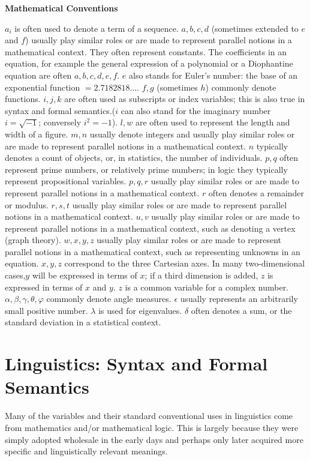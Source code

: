 \documentclass{article}
\begin{document}
 \begin{center}{\bf Mathematical Conventions}\end{center}
\ex $a_i$ is often used to denote a term of a sequence.
\ex $a, b, c, d$ (sometimes extended to $e$ and $f$) usually play similar roles or are made to represent parallel notions in a mathematical context. They often represent constants.
The coefficients in an equation, for example the general expression of a polynomial or a Diophantine equation are often $a, b, c, d, e, f$.
\ex $e$ also stands for Euler's number: the base of an exponential function  $= 2.7182818\ldots$.
\ex $f, g$ (sometimes $h$) commonly denote functions.
\ex $i, j, k$ are often used as subscripts or index variables; this is also true in syntax and formal semantics.($i$ can also stand for the imaginary number $i = \sqrt{-1}$; conversely $i^2 = -1$). 
\ex $l, w$ are often used to represent the length and width of a figure.
\ex $m, n$ usually denote integers and usually play similar roles or are made to represent parallel notions in a mathematical context.
\ex $n$ typically denotes a count of objects, or, in statistics, the number of individuals.
\ex $p, q$ often represent prime numbers, or relatively prime numbers; in logic they typically represent propositional variables.
\ex $p, q, r$ usually play similar roles or are made to represent parallel notions in a mathematical context.
\ex $r$ often denotes a remainder or modulus.
\ex $r, s, t$ usually play similar roles or are made to represent parallel notions in a mathematical context.
\ex $u, v$ usually play similar roles or are made to represent parallel notions in a mathematical context, such as denoting a vertex (graph theory).
\ex $w, x, y, z$ usually play similar roles or are made to represent parallel notions in a mathematical context, such as representing unknowns in an equation.
\ex $x, y, z$ correspond to the three Cartesian axes. In many two-dimensional cases,$y$ will be expressed in terms of $x$; if a third dimension is added, $z$ is expressed in terms of $x$ and $y$.
\ex $z$ is a common variable for a complex number.
\ex $\alpha, \beta, \gamma, \theta, \varphi$ commonly denote angle measures.
\ex $\epsilon$ usually represents an arbitrarily small positive number.
\ex $\lambda$ is used for eigenvalues.
\ex $\delta$ often denotes a sum, or the standard deviation in a statistical context.
\xe \xe \xe \xe \xe \xe \xe \xe \xe \xe \xe \xe \xe \xe \xe \xe \xe \xe \xe \xe 

\section{Linguistics: Syntax and Formal Semantics}
Many of the variables and their standard conventional uses in linguistics come from mathematics and/or mathematical logic. This is largely because they were simply adopted wholesale in the early days and perhaps only later acquired more specific and linguistically relevant meanings. 
\end{document}
